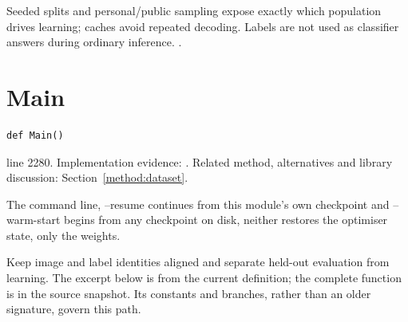 Seeded splits and personal/public sampling expose exactly which population drives learning; caches avoid repeated decoding. Labels are not used as classifier answers during ordinary inference. \cite{marti2002,code2026,torchdata}.


\section{Main}\label{fn:train:Main}
\begin{lstlisting}[style=sig]
def Main()
\end{lstlisting}
 line 2280. Implementation evidence: \cite{code2026}. Related method, alternatives and library discussion: Section~\ref{method:dataset}.


The command line, --resume continues from this module's own checkpoint and --warm-start begins from any checkpoint on disk, neither restores the optimiser state, only the weights.


Keep image and label identities aligned and separate held-out evaluation from learning. The excerpt below is from the current definition; the complete function is in the source snapshot. Its constants and branches, rather than an older signature, govern this path.


